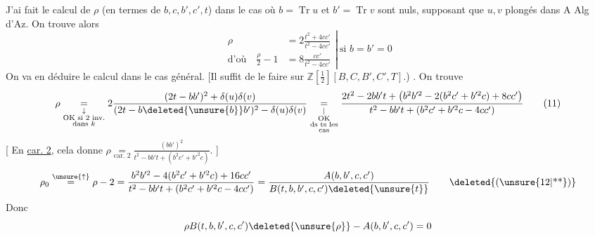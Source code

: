 J'ai fait le calcul de $\rho$ (en termes de $b,c,b',c',t$) dans le cas où $b=\operatorname{Tr}u$ et $b'=\operatorname{Tr}v$ sont nuls,  supposant que $u,v$ plongés dans A Alg d'Az. On trouve alors
\[
\left.\begin{aligned}
\rho&=2\frac{t^2+4cc'}{t^2-4cc'}\\
\text{d'où}\quad \frac{\rho}{2}-1&=8\frac{cc'}{t^2-4cc'}
\end{aligned}\right|\ \text{si } b=b'=0
\]
On va en déduire le calcul dans le cas général. [Il suffit de le faire sur $\mathbb Z[\frac12][B,C,B',C',T]$.) . On trouve
\[
\rho\underset{\substack{\downarrow\\\text{OK si 2 inv.}\\\text{dans }k}}{=}
2\frac{(2t-bb')^2+\delta(u)\delta(v)}{(2t-b\deleted{\unsure{b}}b')^2-\delta(u)\delta(v)}
\underset{\substack{|\\\text{OK}\\\text{ds ts les}\\\text{cas}}}{=}
\frac{2t^2-2bb't+\bigl(b^2b'^2-2(b^2c'+b'^2c)+8cc'\bigr)}
{t^2-bb't+(b^2c'+b'^2c-4cc')} \tag*{(11)}
\]
[ En \uline{car. 2}, cela donne $\displaystyle\rho\underset{\text{car. 2}}{=}\frac{(bb')^2}{t^2-bb't+(b^2c'+b'^2c)}$. ]
\[
\rho_0\overset{\unsure{\uparrow}}{=}\rho-2
=\frac{b^2b'^2-4(b^2c'+b'^2c)+16cc'}{t^2-bb't+(b^2c'+b'^2c-4cc')}
=\frac{A(b,b',c,c')}{B(t,b,b',c,c')\deleted{\unsure{t}}}
\tag*{\deleted{(\unsure{12|**})}}
\]
Donc
\[ \rho B(t,b,b',c,c')\deleted{\unsure{\rho}}-A(b,b',c,c')=0 \]
